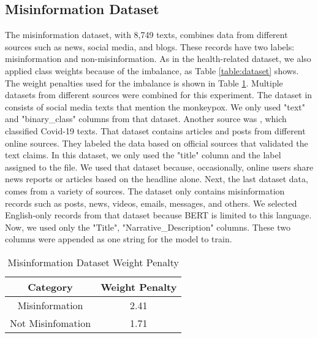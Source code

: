\subsection{Misinformation Dataset}
The misinformation dataset, with 8,749 texts, combines data from different sources such as news, social media, and blogs. These records have two labels: misinformation and non-misinformation. As in the health-related dataset, we also applied class weights because of the imbalance, as Table \ref{table:dataset} shows. The weight penalties used for the imbalance is shown in Table \ref{table:misinformationweight}. Multiple datasets from different sources were combined for this experiment. The dataset in \cite{stephencrone2022} consists of social media texts that mention the monkeypox. We only used "text" and "binary\_class" columns from that dataset. Another source was \cite{coviddata}, which classified Covid-19 texts. That dataset contains articles and posts from different online sources. They labeled the data based on official sources that validated the text claims. In this dataset, we only used the "title" column and the label assigned to the file. We used that dataset because, occasionally, online users share news reports or articles based on the headline alone. Next, the last dataset \cite{covidunesco} data, comes from a variety of sources. The dataset only contains misinformation records such as posts, news, videos, emails, messages, and others. We selected English-only records from that dataset because BERT is limited to this language. Now, we used only the "Title", "Narrative\_Description" columns. These two columns were appended as one string for the model to train.


\begin{table}[H]
	\centering
	\caption{Misinformation Dataset Weight Penalty}
	\begin{tabular}{||c | c||} 
		\hline
		\textbf{Category} & \textbf{Weight Penalty} \\ [1.5ex] 
		\hline
		Misinformation & 2.41  \\ [1ex]
		\hline
		Not Misinfomation & 1.71  \\[1ex]
		\hline
	\end{tabular}
	\label{table:misinformationweight}
\end{table}



